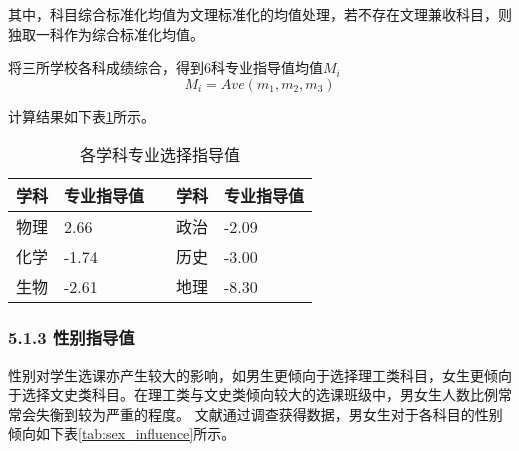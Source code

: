 \documentclass[bwprint]{cumcmthesis}
\begin{document}
其中，科目综合标准化均值为文理标准化的均值处理，若不存在文理兼收科目，则独取一科作为综合标准化均值。

将三所学校各科成绩综合，得到6科专业指导值均值$ M_i $
\begin{equation}
M_i = Ave(m_1,m_2,m_3)
\end{equation}

计算结果如下表\ref{tab:final_major_value}所示。

	\begin{longtable}{p{2.5cm}p{2.5cm}p{1.5cm}p{2.5cm}p{2.5cm}}
		\caption{\label{tab:final_major_value}各学科专业选择指导值}\\
		\toprule
		学科    & \multicolumn{1}{l}{专业指导值} &       & 学科    & \multicolumn{1}{l}{专业指导值} \\
		\midrule
		物理    & 2.66  &       & 政治    & -2.09  \\
		化学    & -1.74  &       & 历史    & -3.00  \\
		生物    & -2.61  &       & 地理    & -8.30  \\
		\bottomrule
	\end{longtable}%


\subsubsection{5.1.3 性别指导值}
性别对学生选课亦产生较大的影响，如男生更倾向于选择理工类科目，女生更倾向于选择文史类科目。在理工类与文史类倾向较大的选课班级中，男女生人数比例常常会失衡到较为严重的程度。
文献\cite{李金波2014高考学科表现的性别差异分析}通过调查获得数据，男女生对于各科目的性别倾向如下表\ref{tab:sex_influence}所示。
\end{document}
